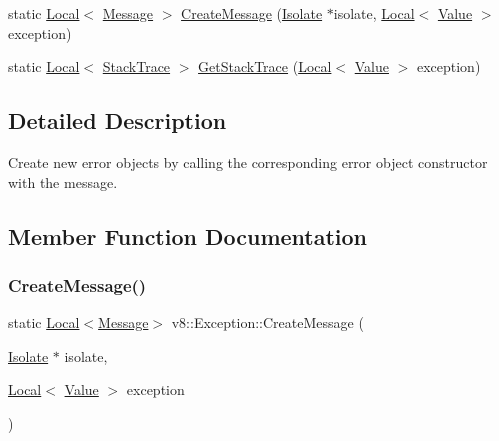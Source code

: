 \begin{DoxyCompactItemize}
\item 
static \mbox{\hyperlink{classv8_1_1Local}{Local}}$<$ \mbox{\hyperlink{classv8_1_1Message}{Message}} $>$ \mbox{\hyperlink{classv8_1_1Exception_a8d575a721cf0fd5b325afb8b586c0d1e}{Create\+Message}} (\mbox{\hyperlink{classv8_1_1Isolate}{Isolate}} $\ast$isolate, \mbox{\hyperlink{classv8_1_1Local}{Local}}$<$ \mbox{\hyperlink{classv8_1_1Value}{Value}} $>$ exception)
\item 
static \mbox{\hyperlink{classv8_1_1Local}{Local}}$<$ \mbox{\hyperlink{classv8_1_1StackTrace}{Stack\+Trace}} $>$ \mbox{\hyperlink{classv8_1_1Exception_a81d1fd3c8d729e9a8d830bc2830bfe77}{Get\+Stack\+Trace}} (\mbox{\hyperlink{classv8_1_1Local}{Local}}$<$ \mbox{\hyperlink{classv8_1_1Value}{Value}} $>$ exception)
\end{DoxyCompactItemize}


\subsection{Detailed Description}
Create new error objects by calling the corresponding error object constructor with the message. 

\subsection{Member Function Documentation}
\mbox{\label{classv8_1_1Exception_a8d575a721cf0fd5b325afb8b586c0d1e}} 
\subsubsection{\texorpdfstring{Create\+Message()}{CreateMessage()}}
{\footnotesize\ttfamily static \mbox{\hyperlink{classv8_1_1Local}{Local}}$<$\mbox{\hyperlink{classv8_1_1Message}{Message}}$>$ v8\+::\+Exception\+::\+Create\+Message (\begin{DoxyParamCaption}\item[{\mbox{\hyperlink{classv8_1_1Isolate}{Isolate}} $\ast$}]{isolate,  }\item[{\mbox{\hyperlink{classv8_1_1Local}{Local}}$<$ \mbox{\hyperlink{classv8_1_1Value}{Value}} $>$}]{exception }\end{DoxyParamCaption})\hspace{0.3cm}{\ttfamily [static]}}

